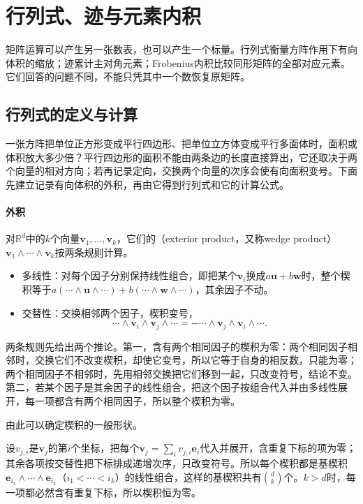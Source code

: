\section{行列式、迹与元素内积}
\label{sec:ls-matrix-scalar-readouts}

矩阵运算可以产生另一张数表，也可以产生一个标量。行列式衡量方阵作用下有向体积的缩放；迹累计主对角元素；Frobenius内积比较同形矩阵的全部对应元素。它们回答的问题不同，不能只凭其中一个数恢复原矩阵。

\subsection{行列式的定义与计算}
\label{sec:ls-exterior-determinants}
\label{sec:linear-algebra-scalar-readouts}

一张方阵把单位正方形变成平行四边形、把单位立方体变成平行多面体时，面积或体积放大多少倍？平行四边形的面积不能由两条边的长度直接算出，它还取决于两个向量的相对方向；若再记录定向，交换两个向量的次序会使有向面积变号。下面先建立记录有向体积的外积，再由它得到行列式和它的计算公式。

\paragraph{外积}
对$\mathbb R^d$中的$k$个向量$\bm v_1,\ldots,\bm v_k$，它们的（exterior product，又称wedge product）$\bm v_1\wedge\cdots\wedge\bm v_k$按两条规则计算。
\begin{itemize}
 \item 多线性：对每个因子分别保持线性组合，即把某个$\bm v_i$换成$a\bm u+b\bm w$时，整个楔积等于$a(\cdots\wedge\bm u\wedge\cdots)+b(\cdots\wedge\bm w\wedge\cdots)$，其余因子不动。
 \item 交替性：交换相邻两个因子，楔积变号，
 \[
  \cdots\wedge\bm v_i\wedge\bm v_j\wedge\cdots
  =-\cdots\wedge\bm v_j\wedge\bm v_i\wedge\cdots.
 \]
\end{itemize}

两条规则先给出两个推论。第一，含有两个相同因子的楔积为零：两个相同因子相邻时，交换它们不改变楔积，却使它变号，所以它等于自身的相反数，只能为零；两个相同因子不相邻时，先用相邻交换把它们移到一起，只改变符号，结论不变。第二，若某个因子是其余因子的线性组合，把这个因子按组合代入并由多线性展开，每一项都含有两个相同因子，所以整个楔积为零。

由此可以确定楔积的一般形状。

设$v_{j,i}$是$\bm v_j$的第$i$个坐标，把每个$\bm v_j=\sum_i v_{j,i}\bm e_i$代入并展开，含重复下标的项为零；其余各项按交替性把下标排成递增次序，只改变符号。所以每个楔积都是基楔积$\bm e_{i_1}\wedge\cdots\wedge\bm e_{i_k}$（$i_1<\cdots<i_k$）的线性组合，这样的基楔积共有$\binom{d}{k}$个。$k>d$时，每一项都必然含有重复下标，所以楔积恒为零。

